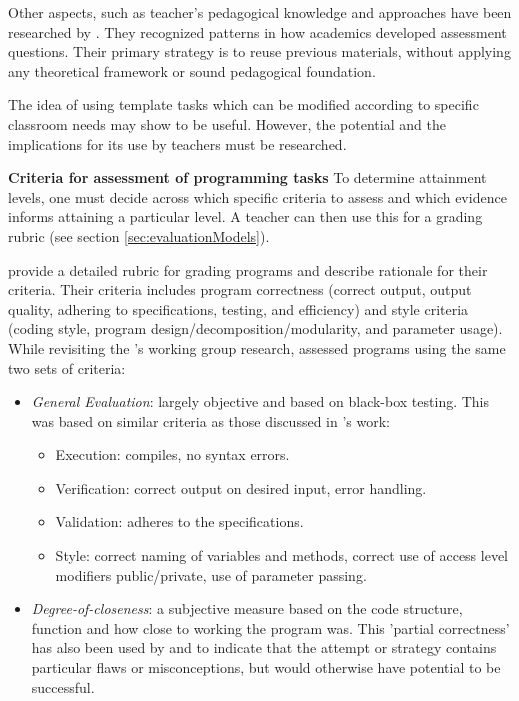 Other aspects, such as teacher's pedagogical knowledge and approaches have been researched by . They recognized patterns in how academics developed assessment questions. Their primary strategy is to reuse previous materials, without applying any theoretical framework or sound pedagogical foundation.


The idea of using template tasks which can be modified according to specific classroom needs may show to be useful. However, the potential and the implications for its use by teachers must be researched.

\noindent \textbf{Criteria for assessment of programming tasks}\newline
To determine attainment levels, one must decide across which specific criteria to assess and which evidence informs attaining a particular level. A teacher can then use this for a grading rubric (see section \ref{sec:evaluationModels}).

 provide a detailed rubric for grading programs and describe rationale for their criteria. Their criteria includes program correctness (correct output, output quality, adhering to specifications, testing, and efficiency) and style criteria (coding style, program design/decomposition/modularity, and parameter usage). While revisiting the \citeauthor{McCracken2001}'s working group research,  assessed programs using the same two sets of criteria:
\begin{itemize}
\item \emph{General Evaluation}: largely objective and based on black-box testing. This was based on similar criteria as those discussed in \citeauthor{smith2005rubricsCriteria}'s work:
    \begin{itemize}
    \item Execution: compiles, no syntax errors.
    \item Verification: correct output on desired input, error handling.
    \item Validation: adheres to the specifications.
    \item Style: correct naming of variables and methods, correct use of access level modifiers public/private, use of parameter passing.
    \end{itemize}


\item \emph{Degree-of-closeness}: a subjective measure based on the code structure, function and how close to working the program was. This 'partial correctness' has also been used by  and  to indicate that the attempt or strategy contains particular flaws or misconceptions, but would otherwise have potential to be successful.

\end{itemize}

